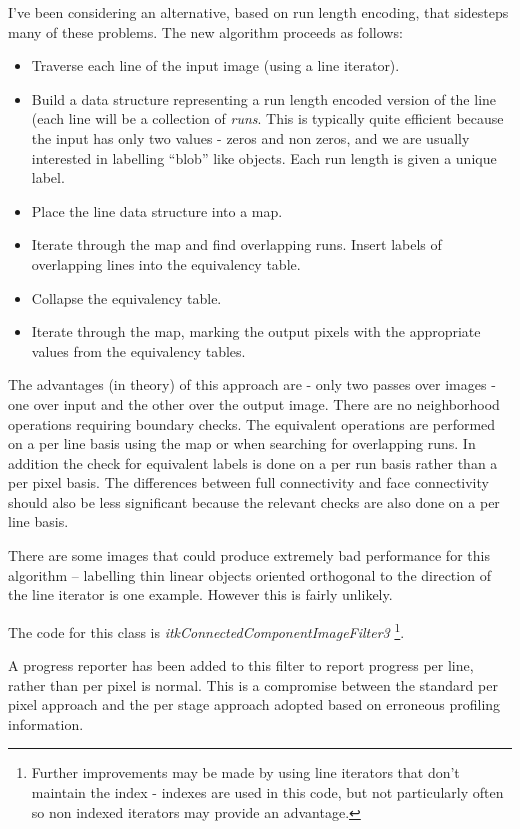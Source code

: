 \documentclass{InsightArticle}
\begin{document}
I've been considering an alternative, based on run length encoding,
that sidesteps many of these problems. The new algorithm proceeds as follows:
\begin{itemize}
\item Traverse each line of the input image (using a line iterator).
\item Build a data structure representing a run length encoded version
 of the line (each line will be a collection of {\em runs}. This is
 typically quite efficient because the input has only two values -
 zeros and non zeros, and we are usually interested in labelling
 ``blob'' like objects. Each run length is given a unique label.
\item Place the line data structure into a map.
\item Iterate through the map and find overlapping runs. Insert labels 
of overlapping lines into the equivalency table.
\item Collapse the equivalency table.
\item Iterate through the map, marking the output pixels with the appropriate values from the equivalency tables.
\end{itemize}

The advantages (in theory) of this approach are - only two passes over
images - one over input and the other over the output image. There are
no neighborhood operations requiring boundary checks. The equivalent
operations are performed on a per line basis using the map or when
searching for overlapping runs. In addition the check for equivalent
labels is done on a per run basis rather than a per pixel basis. The
differences between full connectivity and face connectivity should
also be less significant because the relevant checks are also done on
a per line basis.

There are some images that could produce extremely bad performance for
this algorithm -- labelling thin linear objects oriented orthogonal to
the direction of the line iterator is one example. However this is
fairly unlikely.

The code for this class is {\em itkConnectedComponentImageFilter3}
\footnote{Further improvements may be made by using line iterators
that don't maintain the index - indexes are used in this code, but not
particularly often so non indexed iterators may provide an advantage.}.

A progress reporter has been added to this filter to report progress
per line, rather than per pixel is normal. This is a compromise
between the standard per pixel approach and the per stage approach
adopted based on erroneous profiling information.
\end{document}
